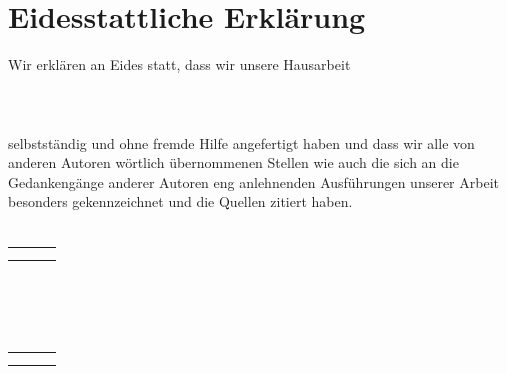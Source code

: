 
\section*{Eidesstattliche Erklärung}

Wir erklären an Eides statt, dass wir unsere Hausarbeit \\ \\
\titel \\ \\
selbstständig und ohne fremde Hilfe angefertigt haben und dass wir alle von anderen Autoren wörtlich übernommenen Stellen wie auch die sich an die Gedankengänge anderer Autoren eng anlehnenden Ausführungen unserer Arbeit besonders gekennzeichnet und die Quellen zitiert haben.
\\ \\

\begin{tabular}{ p{6cm} p{3cm} p{6cm} }
	& & \\\cline{1-1}\cline{3-3}
	\makebox[6cm]{Ort, Datum} & \makebox[3cm]{} & \makebox[6cm]{Unterschrift}
\end{tabular}
\\
\\
\\
\begin{tabular}{ p{6cm} p{3cm} p{6cm} }
	& & \\\cline{1-1}\cline{3-3}
	\makebox[6cm]{Ort, Datum} & \makebox[3cm]{} & \makebox[6cm]{Unterschrift}
\end{tabular}